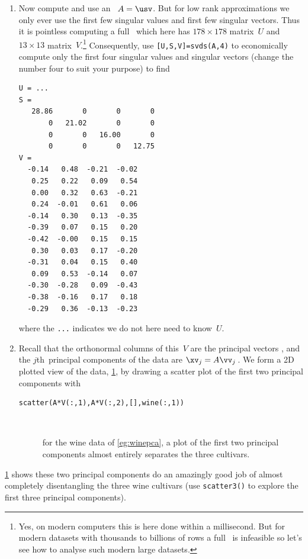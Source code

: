 \begin{example}
\begin{solution}
\begin{enumerate}
\item Now compute and use an \svd\ \(A=\usv\).
But for low rank approximations we only ever use the first few singular values and first few singular vectors.
Thus it is pointless computing a full \svd\ which here has \(178\times178\) matrix~\(U\) and \(13\times13\) matrix~\(V\).\footnote{Yes, on modern computers this is here done within a millisecond.  
But for modern datasets with thousands to billions of rows a full \svd\ is infeasible so let's see how to analyse such modern large datasets.}
Consequently, use \verb|[U,S,V]=svds(A,4)| to economically compute only the first four singular values and singular vectors (change the number four to suit your purpose) to find \twodp
\begin{verbatim}
U = ...
S =
   28.86       0       0       0
       0   21.02       0       0
       0       0   16.00       0
       0       0       0   12.75
V =
  -0.14   0.48  -0.21  -0.02
   0.25   0.22   0.09   0.54
   0.00   0.32   0.63  -0.21
   0.24  -0.01   0.61   0.06
  -0.14   0.30   0.13  -0.35
  -0.39   0.07   0.15   0.20
  -0.42  -0.00   0.15   0.15
   0.30   0.03   0.17  -0.20
  -0.31   0.04   0.15   0.40
   0.09   0.53  -0.14   0.07
  -0.30  -0.28   0.09  -0.43
  -0.38  -0.16   0.17   0.18
  -0.29   0.36  -0.13  -0.23
\end{verbatim}
where the \verb|...| indicates we do not here need to know~\(U\).

\item Recall that the orthonormal columns of this~\(V\) are the principal vectors \hlist{}, and the \(j\)th~principal components of the data are \(\xv_j=A\vv_j\)\,.
We form a 2D plotted view of the data, \cref{fig:winepca}, by drawing a scatter plot of the first two principal components with 
\begin{verbatim}
scatter(A*V(:,1),A*V(:,2),[],wine(:,1))
\end{verbatim}
\begin{figure}
\centering
\\
\caption{for the wine data of \cref{eg:winepca}, a plot of the first two principal components almost entirely separates the three cultivars.}
\label{fig:winepca}
\end{figure}
\end{enumerate}
\cref{fig:winepca} shows these two principal components do an amazingly good job of almost completely disentangling the three wine cultivars (use \verb|scatter3()| to explore the first three principal components).
\end{solution}
\end{example}


